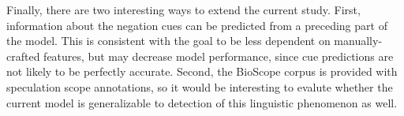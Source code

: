 \documentclass{article}
\begin{document}
\begin{multicols}{2}
Finally, there are two interesting ways to extend the current study. First, information about the negation cues can be predicted from a preceding part of the model. This is consistent with the goal to be less dependent on manually-crafted features, but may decrease model performance, since cue predictions are not likely to be perfectly accurate. Second, the BioScope corpus is provided with speculation scope annotations, so it would be interesting to evalute whether the current model is generalizable to detection of this linguistic phenomenon as well.

\end{multicols}

\newpage


\end{document}
